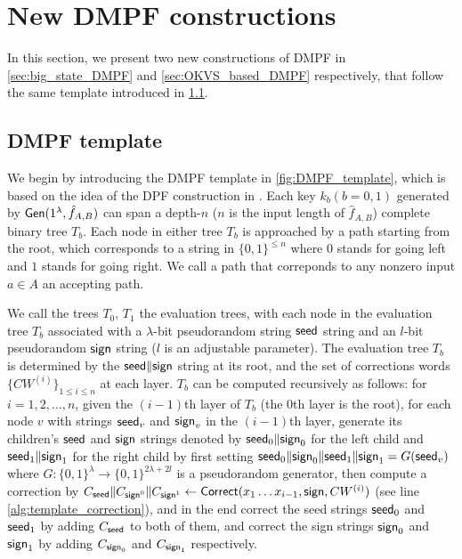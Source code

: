\section{New DMPF constructions}
In this section, we present two new constructions of DMPF in \cref{sec:big_state_DMPF} and \cref{sec:OKVS_based_DMPF} respectively,  that follow the same template introduced in \cref{sec:DMPF_template}. 

\subsection{DMPF template}\label{sec:DMPF_template}
We begin by introducing the DMPF template in \cref{fig:DMPF_template}, which is based on the idea of the DPF construction in \cite{CCS:BoyGilIsh16}. Each key $k_b(b=0,1)$ generated by ${\sf Gen}(1^\lambda,\hat{f}_{A,B})$ can span a depth-$n$ ($n$ is the input length of $\hat{f}_{A,B}$) complete binary tree $T_b$. Each node in either tree $T_b$ is approached by a path starting from the root, which corresponds to a string in $\{0,1\}^{\le n}$ where $0$ stands for going left and $1$ stands for going right. We call a path that correponds to any nonzero input $a\in A$ an accepting path. 



We call the trees $T_0$, $T_1$ the evaluation trees, with each node in the evaluation tree $T_b$ associated with a $\lambda$-bit pseudorandom string ${\sf seed}$ string and an $l$-bit pseudorandom ${\sf sign}$ string ($l$ is an adjustable parameter). 
The evaluation tree $T_b$ is determined by the ${\sf seed}\|{\sf sign}$ string at its root, and the set of corrections words $\{CW^{(i)}\}_{1\le i\le n}$ at each layer. $T_b$ can be computed recursively as follows: for $i = 1,2,\dots, n$, given the $(i-1)$th layer of $T_b$ (the 0th layer is the root), for each node $v$ with strings ${\sf seed}_v$ and ${\sf sign}_v$ in the $(i-1)$th layer, generate its children's ${\sf seed}$ and ${\sf sign}$ strings denoted by ${\sf seed}_0\|{\sf sign}_0$ for the left child and ${\sf seed}_1\|{\sf sign}_1$ for the right child by first setting ${\sf seed}_0\|{\sf sign}_0\|{\sf seed}_1\|{\sf sign}_1 = G({\sf seed}_v)$ where $G:\{0,1\}^\lambda\rightarrow \{0,1\}^{2\lambda+2l}$ is a pseudorandom generator, then compute a correction by $C_{\sf seed}\|C_{{\sf sign}^0}\|C_{{\sf sign}^1}\gets{\sf Correct}(x_1\dots x_{i-1}, {\sf sign}, CW^{(i)})$ (see line \ref{alg:template_correction}), and in the end correct the seed strings ${\sf seed}_0$ and ${\sf seed}_1$ by adding $C_{\sf seed}$ to both of them, and correct the sign strings ${\sf sign}_0$ and ${\sf sign}_1$ by adding $C_{{\sf sign}_0}$ and $C_{{\sf sign}_1}$ respectively. 


